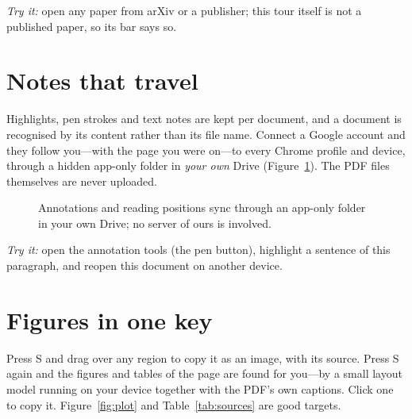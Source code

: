 \documentclass[11pt]{article}
\begin{document}
\noindent\emph{Try it:} open any paper from arXiv or a publisher; this tour
itself is not a published paper, so its bar says so.

\section{Notes that travel}
Highlights, pen strokes and text notes are kept per document, and a document
is recognised by its content rather than its file name. Connect a Google
account and they follow you---with the page you were on---to every Chrome
profile and device, through a hidden app-only folder in \emph{your own}
Drive (Figure~\ref{fig:sync}). The PDF files themselves are never uploaded.

\begin{figure}[h]
\centering
{}
\caption{Annotations and reading positions sync through an app-only folder in
your own Drive; no server of ours is involved.}
\label{fig:sync}
\end{figure}

\noindent\emph{Try it:} open the annotation tools (the pen button), highlight
a sentence of this paragraph, and reopen this document on another device.

\section{Figures in one key}
Press \textsf{S} and drag over any region to copy it as an image, with its
source. Press \textsf{S} again and the figures and tables of the page are
found for you---by a small layout model running on your device
\cite{ppdoclayout} together with the PDF's own captions. Click one to copy it.
Figure~\ref{fig:plot} and Table~\ref{tab:sources} are good targets.
\end{document}
